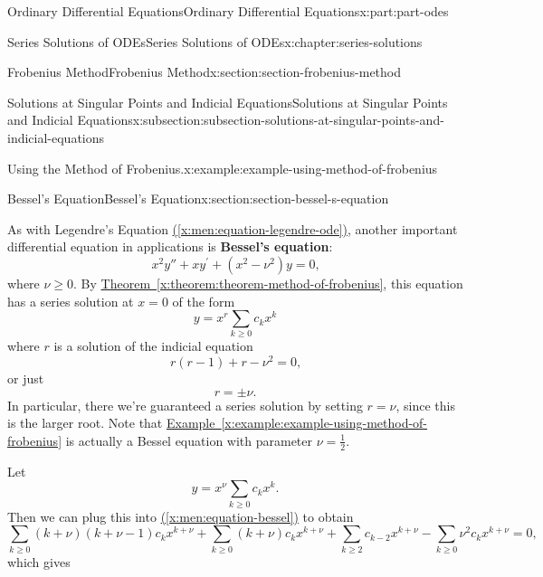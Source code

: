 \documentclass[twoside,10pt,]{book}
\newcommand{\xreffont}{\relax}
\newcommand{\terminology}[1]{\textbf{#1}}
\numberwithin{equation}{part}
\begin{document}
\begin{partptx}{Ordinary Differential Equations}{}{Ordinary Differential Equations}{}{}{x:part:part-odes}
\begin{chapterptx}{Series Solutions of ODEs}{}{Series Solutions of ODEs}{}{}{x:chapter:series-solutions}
\begin{sectionptx}{Frobenius Method}{}{Frobenius Method}{}{}{x:section:section-frobenius-method}
\begin{subsectionptx}{Solutions at Singular Points and Indicial Equations}{}{Solutions at Singular Points and Indicial Equations}{}{}{x:subsection:subsection-solutions-at-singular-points-and-indicial-equations}
\begin{example}{Using the Method of Frobenius.}{x:example:example-using-method-of-frobenius}
%
\end{example}
\end{subsectionptx}
\end{sectionptx}
%
%
\typeout{************************************************}
\typeout{************************************************}
%
\begin{sectionptx}{Bessel's Equation}{}{Bessel's Equation}{}{}{x:section:section-bessel-s-equation}
\begin{introduction}{}%
As with Legendre's Equation \hyperref[x:men:equation-legendre-ode]{({\xreffont\ref{x:men:equation-legendre-ode}})}, another important differential equation in applications is \terminology{Bessel's equation}:%
\begin{equation}
x^{2}y'' + xy^\prime + (x^{2} - \nu^{2})y = 0\text{,}\label{x:men:equation-bessel}
\end{equation}
where \(\nu \geq 0\). By \hyperref[x:theorem:theorem-method-of-frobenius]{Theorem~{\xreffont\ref{x:theorem:theorem-method-of-frobenius}}}, this equation has a series solution at \(x = 0\) of the form%
\begin{equation*}
y = x^{r}\sum_{k\geq0}c_{k}x^{k}
\end{equation*}
where \(r\) is a solution of the indicial equation%
\begin{equation*}
r(r - 1) + r - \nu^{2} = 0\text{,}
\end{equation*}
or just%
\begin{equation*}
r = \pm\nu\text{.}
\end{equation*}
In particular, there we're guaranteed a series solution by setting \(r = \nu\), since this is the larger root. Note that \hyperref[x:example:example-using-method-of-frobenius]{Example~{\xreffont\ref{x:example:example-using-method-of-frobenius}}} is actually a Bessel equation with parameter \(\nu = \frac{1}{2}\).%
\par
Let%
\begin{equation*}
y = x^{\nu}\sum_{k\geq0}c_{k}x^{k}\text{.}
\end{equation*}
Then we can plug this into \hyperref[x:men:equation-bessel]{({\xreffont\ref{x:men:equation-bessel}})} to obtain%
\begin{equation}
\sum_{k\geq0}(k+\nu)(k+\nu-1)c_{k}x^{k + \nu} + \sum_{k\geq0}(k+\nu)c_{k}x^{k + \nu} + \sum_{k\geq2}c_{k-2}x^{k + \nu} - \sum_{k\geq0}\nu^{2}c_{k}x^{k + \nu} = 0\text{,}\label{x:men:equation-bessel-plugged-in}
\end{equation}
which gives%

\end{introduction}
\end{sectionptx}
\end{chapterptx}
\end{partptx}
\end{document}
